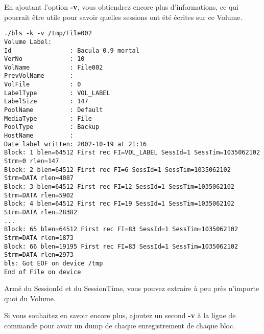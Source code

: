 En ajoutant l'option {\bf -v}, vous obtiendrez encore plus d'informations, ce 
qui pourrait être utile pour savoir quelles sessions ont été écrites sur ce
Volume.

\footnotesize
\begin{verbatim}
./bls -k -v /tmp/File002
Volume Label:
Id                : Bacula 0.9 mortal
VerNo             : 10
VolName           : File002
PrevVolName       :
VolFile           : 0
LabelType         : VOL_LABEL
LabelSize         : 147
PoolName          : Default
MediaType         : File
PoolType          : Backup
HostName          :
Date label written: 2002-10-19 at 21:16
Block: 1 blen=64512 First rec FI=VOL_LABEL SessId=1 SessTim=1035062102 Strm=0 rlen=147
Block: 2 blen=64512 First rec FI=6 SessId=1 SessTim=1035062102 Strm=DATA rlen=4087
Block: 3 blen=64512 First rec FI=12 SessId=1 SessTim=1035062102 Strm=DATA rlen=5902
Block: 4 blen=64512 First rec FI=19 SessId=1 SessTim=1035062102 Strm=DATA rlen=28382
...
Block: 65 blen=64512 First rec FI=83 SessId=1 SessTim=1035062102 Strm=DATA rlen=1873
Block: 66 blen=19195 First rec FI=83 SessId=1 SessTim=1035062102 Strm=DATA rlen=2973
bls: Got EOF on device /tmp
End of File on device
\end{verbatim}
\normalsize

Armé du SessionId et du SessionTime, vous pouvez extraire à peu près
n'importe quoi du Volume.

Si vous souhaitez en savoir encore plus, ajoutez un second {\bf -v} à la ligne
de commande pour avoir un dump de chaque enregistrement de chaque bloc.

